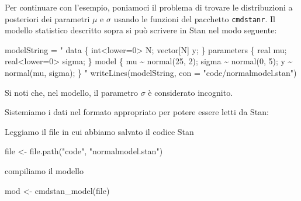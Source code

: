 \documentclass[
  11pt,
]{krantz}
\makeatletter
\newenvironment{Shaded}{\begin{snugshade}}{\end{snugshade}}
\newcommand{\AttributeTok}[1]{\textcolor[rgb]{0.61,0.61,0.61}{#1}}
\newcommand{\FunctionTok}[1]{\textcolor[rgb]{0,0,0}{#1}}
\newcommand{\NormalTok}[1]{#1}
\newcommand{\OtherTok}[1]{\textcolor[rgb]{0.37,0.37,0.37}{#1}}
\newcommand{\SpecialCharTok}[1]{\textcolor[rgb]{0,0,0}{#1}}
\newcommand{\StringTok}[1]{\textcolor[rgb]{0.5,0.5,0.5}{#1}}
\newenvironment{kframe}{%
\medskip{}
\setlength{\fboxsep}{.8em}
 \def\at@end@of@kframe{}%
 \ifinner\ifhmode%
  \def\at@end@of@kframe{\end{minipage}}%
  \begin{minipage}{\columnwidth}%
 \fi\fi%
 \def\FrameCommand##1{\hskip\@totalleftmargin \hskip-\fboxsep
 \colorbox{shadecolor}{##1}\hskip-\fboxsep
     \hskip-\linewidth \hskip-\@totalleftmargin \hskip\columnwidth}%
 \MakeFramed {\advance\hsize-\width
   \@totalleftmargin\z@ \linewidth\hsize
   \@setminipage}}%
 {\par\unskip\endMakeFramed%
 \at@end@of@kframe}
\renewenvironment{Shaded}{\begin{kframe}}{\end{kframe}}
\theoremstyle{definition}
\theoremstyle{definition}
\theoremstyle{definition}
\theoremstyle{definition}
\theoremstyle{remark}
\makeatother
\begin{document}
Per continuare con l'esempio, poniamoci il problema di trovare le distribuzioni a posteriori dei parametri \(\mu\) e \(\sigma\) usando le funzioni del pacchetto \texttt{cmdstanr}. Il modello statistico descritto sopra si può scrivere in Stan nel modo seguente:

\begin{Shaded}
\begin{Highlighting}[]
\NormalTok{modelString }\OtherTok{=} \StringTok{"}
\StringTok{data \{}
\StringTok{  int\textless{}lower=0\textgreater{} N;}
\StringTok{  vector[N] y;}
\StringTok{\}}
\StringTok{parameters \{}
\StringTok{  real mu;}
\StringTok{  real\textless{}lower=0\textgreater{} sigma;}
\StringTok{\}}
\StringTok{model \{}
\StringTok{  mu \textasciitilde{} normal(25, 2);}
\StringTok{  sigma \textasciitilde{} normal(0, 5);}
\StringTok{  y \textasciitilde{} normal(mu, sigma);}
\StringTok{\}}
\StringTok{"}
\FunctionTok{writeLines}\NormalTok{(modelString, }\AttributeTok{con =} \StringTok{"code/normalmodel.stan"}\NormalTok{)}
\end{Highlighting}
\end{Shaded}

Si noti che, nel modello, il parametro \(\sigma\) è considerato incognito.

Sistemiamo i dati nel formato appropriato per potere essere letti da Stan:

\begin{Shaded}
\end{Shaded}

Leggiamo il file in cui abbiamo salvato il codice Stan

\begin{Shaded}
\begin{Highlighting}[]
\NormalTok{file }\OtherTok{\textless{}{-}} \FunctionTok{file.path}\NormalTok{(}\StringTok{"code"}\NormalTok{, }\StringTok{"normalmodel.stan"}\NormalTok{)}
\end{Highlighting}
\end{Shaded}

compiliamo il modello

\begin{Shaded}
\begin{Highlighting}[]
\NormalTok{mod }\OtherTok{\textless{}{-}} \FunctionTok{cmdstan\_model}\NormalTok{(file)}
\end{Highlighting}
\end{Shaded}
\end{document}
